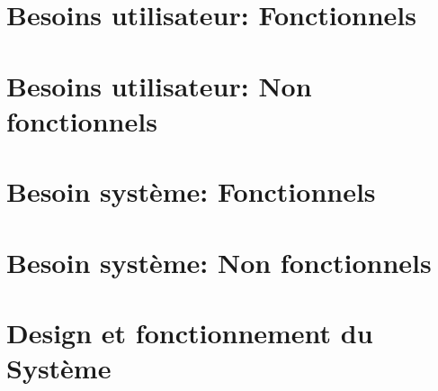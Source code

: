 \documentclass{scrreprt}
\begin{document}
\chapter{Besoins utilisateur: Fonctionnels}



\chapter{Besoins utilisateur: Non fonctionnels}



\chapter{Besoin système: Fonctionnels}


\chapter{Besoin système: Non fonctionnels}


\chapter{Design et fonctionnement du Système}
\end{document}
